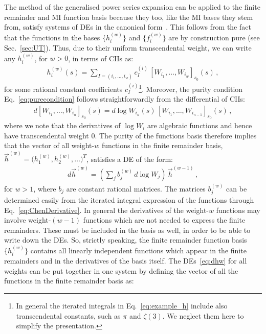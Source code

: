 \documentclass[main.tex]{subfiles}
\begin{document}
The method of the generalised power series expansion can be applied to the finite remainder and MI function basis because they too, like the MI bases they stem from, satisfy systems of DEs in the canonical form~\cite{Henn:2013pwa}. This follows from the fact that the functions in the bases $\{h^{(w)}_i\}$ and $\{f^{(w)}_i\}$ are by construction pure (see Sec.~\ref{sec:UT}). Thus, due to their uniform transcendental weight, we can write any $h^{(w)}_i$, for $w>0$, in terms of CIIs as:
\begin{align} \label{eq:example_h}
h^{(w)}_{i}(s) = \sum_{I = (i_1,\ldots,i_w)} c_I^{(i)} \, \left[W_{i_1}, \ldots, W_{i_w}  \right]_{s_0} (s) \, ,
\end{align}
for some rational constant coefficients $c_I^{(i)}$\footnote{In general the iterated integrals in Eq.~\ref{eq:example_h} include also transcendental constants, such as $\pi$ and $\zeta(3)$. We neglect them here to simplify the presentation.}.
Moreover, the purity condition Eq.~\ref{eq:purecondition} follows straightforwardly from the differential of CIIs:
\begin{align} \label{eq:ChenDerivative}
d \left[W_{i_1}, \ldots, W_{i_n}  \right]_{s_0} (s) = d \log W_{i_n}(s) \, \left[W_{i_1}, \ldots, W_{i_{n-1}}  \right]_{s_0} (s) \,,
\end{align}
where we note that the derivatives of $\log W_i$ are algebraic functions and hence have transcendental weight $0$.
The purity of the functions basis therefore implies that the vector of all weight-$w$ functions in the finite remainder basis, $\vec{h}^{(w)}= \bigl(h^{(w)}_1, h^{(w)}_2, \ldots \bigr)^T$, satisfies a DE of the form:
\begin{align} \label{eq:dhw}
d \vec{h}^{(w)} = \left( \sum_{j} b_j^{(w)} \, d\log W_j  \right) \,  \vec{h}^{(w-1)} \,,
\end{align}
for $w>1$, where $b_j$ are constant rational matrices. The matrices $b_j^{(w)}$ can be determined easily from the iterated integral expression of the functions through Eq.~\ref{eq:ChenDerivative}. 
In general the derivatives of the weight-$w$ functions may involve weight-$(w-1)$ functions which are not needed to express the finite remainders. These must be included in the basis as well, in order to be able to write down the DEs. So, strictly speaking, the finite remainder function basis $\{h^{(w)}_i\}$ contains all linearly independent functions which appear in the finite remainders and in the derivatives of the basis itself.
The DEs~\ref{eq:dhw} for all weights can be put together in one system by defining the vector of all the functions in the finite remainder basis as:
\end{document}
